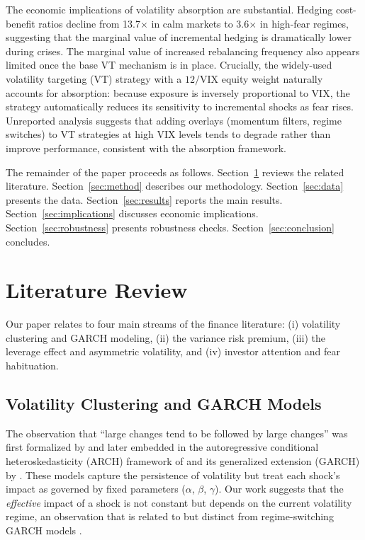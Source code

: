 \documentclass[12pt,a4paper]{article}
\begin{document}
The economic implications of volatility absorption are substantial. Hedging cost-benefit ratios decline from 13.7$\times$ in calm markets to 3.6$\times$ in high-fear regimes, suggesting that the marginal value of incremental hedging is dramatically lower during crises. The marginal value of increased rebalancing frequency also appears limited once the base VT mechanism is in place. Crucially, the widely-used volatility targeting (VT) strategy with a $12/\text{VIX}$ equity weight naturally accounts for absorption: because exposure is inversely proportional to VIX, the strategy automatically reduces its sensitivity to incremental shocks as fear rises. Unreported analysis suggests that adding overlays (momentum filters, regime switches) to VT strategies at high VIX levels tends to degrade rather than improve performance, consistent with the absorption framework.

The remainder of the paper proceeds as follows. Section~\ref{sec:lit} reviews the related literature. Section~\ref{sec:method} describes our methodology. Section~\ref{sec:data} presents the data. Section~\ref{sec:results} reports the main results. Section~\ref{sec:implications} discusses economic implications. Section~\ref{sec:robustness} presents robustness checks. Section~\ref{sec:conclusion} concludes.


\section{Literature Review}
\label{sec:lit}

Our paper relates to four main streams of the finance literature: (i) volatility clustering and GARCH modeling, (ii) the variance risk premium, (iii) the leverage effect and asymmetric volatility, and (iv) investor attention and fear habituation.

\subsection{Volatility Clustering and GARCH Models}

The observation that ``large changes tend to be followed by large changes'' was first formalized by \citet{mandelbrot1963} and later embedded in the autoregressive conditional heteroskedasticity (ARCH) framework of \citet{engle1982} and its generalized extension (GARCH) by \citet{bollerslev1986}. These models capture the persistence of volatility but treat each shock's impact as governed by fixed parameters ($\alpha$, $\beta$, $\gamma$). Our work suggests that the \textit{effective} impact of a shock is not constant but depends on the current volatility regime, an observation that is related to but distinct from regime-switching GARCH models \citep{hamilton1989, haas2004}.
\end{document}
